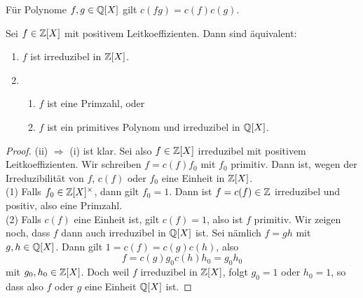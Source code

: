 \documentclass{book}
\begin{document}
\begin{cor}
    \label{cor:inhalt}
    Für Polynome $f,g \in \mathbb{Q}[X]$ gilt $c(fg) = c(f)c(g)$. 
\end{cor}

\begin{thm}
    \label{thm:gauß}
    Sei $f \in \mathbb{Z}[X]$ mit positivem Leitkoeffizienten. 
    Dann sind äquivalent:
    \begin{enumerate}[label=(\roman *)]
        \item $f$ ist irreduzibel in $\mathbb{Z}[X]$.
        \item \begin{enumerate}
            \item $f$ ist eine Primzahl, oder
            \item $f$ ist ein primitives Polynom und irreduzibel in $\mathbb{Q}[X]$.
        \end{enumerate}
    \end{enumerate}
\end{thm}
\begin{proof}
    (ii) $\Rightarrow$ (i) ist klar. Sei also $f \in \mathbb{Z}[X]$ irreduzibel mit
    positivem Leitkoeffizienten. Wir schreiben $f = c(f) f_0$ mit $f_0$
    primitiv. Dann ist, wegen der Irreduzibilität von $f$, $c(f)$ oder $f_0$ eine
    Einheit in $\mathbb{Z}[X]$.\\

    \noindent
    (1) Falls $f_0 \in \mathbb{Z}[X]^{\times}$, dann gilt $f_0 = 1$. Dann ist $f = c(f) \in \mathbb{Z}$ irreduzibel und positiv, also eine Primzahl.\\

    \noindent
    (2) Falls $c(f)$ eine Einheit ist, gilt $c(f) = 1$,
    also ist $f$ primitiv. Wir zeigen noch, dass $f$ dann auch irreduzibel in
    $\mathbb{Q}[X]$ ist. Sei nämlich $f = gh$ mit $g,h \in \mathbb{Q}[X]$. Dann gilt $1 =
    c(f) = c(g)c(h)$, also 
    \[
        f = c(g)g_0 c(h)h_0 = g_0 h_0 
    \]
    mit $g_0,h_0 \in \mathbb{Z}[X]$. Doch weil $f$ irreduzibel in $\mathbb{Z}[X]$, folgt $g_0
    = 1$ oder $h_0 = 1$, so dass also $f$ oder $g$ eine Einheit $\mathbb{Q}[X]$ ist. 
\end{proof}
\end{document}
